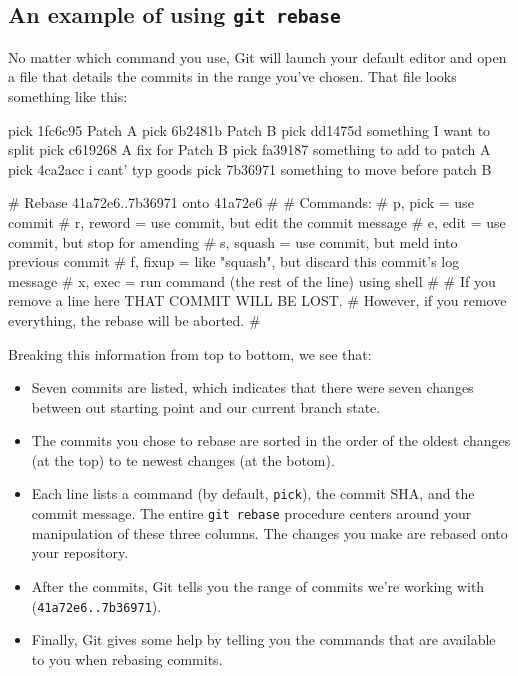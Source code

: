 \subsection{An example of using \texttt{git rebase}}
No matter which command you use, Git will launch your default editor and open a file that details the commits in the range you've chosen. That file looks something like this:
\begin{exampleblock}
    \begin{codeblock}[language=bash]
pick 1fc6c95 Patch A
pick 6b2481b Patch B
pick dd1475d something I want to split
pick c619268 A fix for Patch B
pick fa39187 something to add to patch A
pick 4ca2acc i cant' typ goods
pick 7b36971 something to move before patch B

# Rebase 41a72e6..7b36971 onto 41a72e6
#
# Commands:
#  p, pick = use commit
#  r, reword = use commit, but edit the commit message
#  e, edit = use commit, but stop for amending
#  s, squash = use commit, but meld into previous commit
#  f, fixup = like "squash", but discard this commit's log message
#  x, exec = run command (the rest of the line) using shell
#
# If you remove a line here THAT COMMIT WILL BE LOST.
# However, if you remove everything, the rebase will be aborted.
#
    \end{codeblock}
\end{exampleblock}

Breaking this information from top to bottom, we see that:
\begin{itemize}
    \item Seven commits are listed, which indicates that there were seven changes between out starting point and our current branch state.
    \item The commits you chose to rebase are sorted in the order of the oldest changes (at the top) to te newest changes (at the botom).
    \item Each line lists a command (by default, \texttt{pick}), the commit SHA, and the commit message. The entire \texttt{git rebase} procedure centers around your manipulation of these three columns. The changes you make are rebased onto your repository. 
    \item After the commits, Git tells you the range of commits we're working with (\texttt{41a72e6..7b36971}).
    \item Finally, Git gives some help by telling you the commands that are available to you when rebasing commits. 
\end{itemize}





